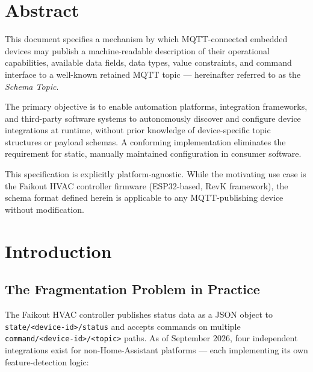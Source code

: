 \documentclass[11pt,a4paper]{article}
\newcommand{\topic}[1]{\texttt{\color{accent}#1}}
\begin{document}
\section{Abstract}

This document specifies a mechanism by which MQTT-connected embedded devices may publish a machine-readable description of their operational capabilities, available data fields, data types, value constraints, and command interface to a well-known retained MQTT topic — hereinafter referred to as the \emph{Schema Topic}.

The primary objective is to enable automation platforms, integration frameworks, and third-party software systems to autonomously discover and configure device integrations at runtime, without prior knowledge of device-specific topic structures or payload schemas. A conforming implementation eliminates the requirement for static, manually maintained configuration in consumer software.

This specification is explicitly platform-agnostic. While the motivating use case is the Faikout HVAC controller firmware (ESP32-based, RevK framework), the schema format defined herein is applicable to any MQTT-publishing device without modification.

\section{Introduction}

\subsection{The Fragmentation Problem in Practice}

The Faikout HVAC controller publishes status data as a JSON object to \topic{state/\textless device-id\textgreater/status} and accepts commands on multiple \topic{command/\textless device-id\textgreater/\textless topic\textgreater} paths. As of September 2026, four independent integrations exist for non-Home-Assistant platforms — each implementing its own feature-detection logic:
\end{document}
